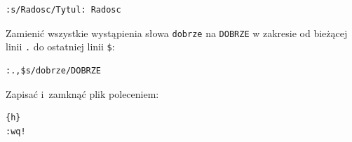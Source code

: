 \begin{example}
\begin{lstlisting}[style=MyBashStyle]
:s/Radosc/Tytul: Radosc
\end{lstlisting}

\begin{myitemize}
\item Zamienić wszystkie wystąpienia słowa \lstinline[style=MyBashStyle]{dobrze} na \lstinline[style=MyBashStyle]{DOBRZE} w zakresie od bieżącej linii \lstinline[style=MyBashStyle]{.} do ostatniej linii \lstinline[style=MyBashStyle]{$}:
\end{myitemize}

\begin{lstlisting}[style=MyBashStyle]
:.,$s/dobrze/DOBRZE
\end{lstlisting}

Zapisać i~zamknąć plik poleceniem:

\begin{lstlisting}[style=MyBashStyle]{h}
:wq!
\end{lstlisting}
\end{example}

\clearpage
{}
{\label{viRef}

}



